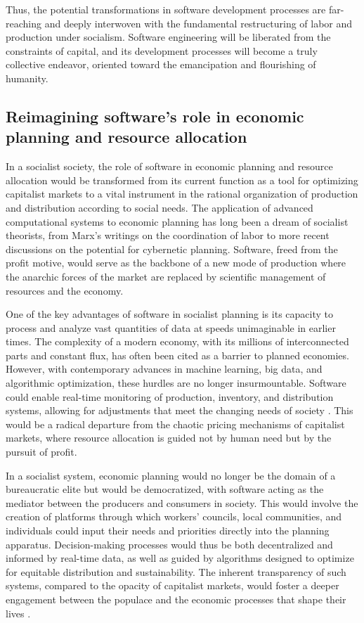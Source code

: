 \begin{refsection}
Thus, the potential transformations in software development processes are far-reaching and deeply interwoven with the fundamental restructuring of labor and production under socialism. Software engineering will be liberated from the constraints of capital, and its development processes will become a truly collective endeavor, oriented toward the emancipation and flourishing of humanity.

\subsection{Reimagining software's role in economic planning and resource allocation}

In a socialist society, the role of software in economic planning and resource allocation would be transformed from its current function as a tool for optimizing capitalist markets to a vital instrument in the rational organization of production and distribution according to social needs. The application of advanced computational systems to economic planning has long been a dream of socialist theorists, from Marx's writings on the coordination of labor to more recent discussions on the potential for cybernetic planning. Software, freed from the profit motive, would serve as the backbone of a new mode of production where the anarchic forces of the market are replaced by scientific management of resources and the economy.

One of the key advantages of software in socialist planning is its capacity to process and analyze vast quantities of data at speeds unimaginable in earlier times. The complexity of a modern economy, with its millions of interconnected parts and constant flux, has often been cited as a barrier to planned economies. However, with contemporary advances in machine learning, big data, and algorithmic optimization, these hurdles are no longer insurmountable. Software could enable real-time monitoring of production, inventory, and distribution systems, allowing for adjustments that meet the changing needs of society \cite[pp.~43-45]{cockshott1993}. This would be a radical departure from the chaotic pricing mechanisms of capitalist markets, where resource allocation is guided not by human need but by the pursuit of profit.

In a socialist system, economic planning would no longer be the domain of a bureaucratic elite but would be democratized, with software acting as the mediator between the producers and consumers in society. This would involve the creation of platforms through which workers’ councils, local communities, and individuals could input their needs and priorities directly into the planning apparatus. Decision-making processes would thus be both decentralized and informed by real-time data, as well as guided by algorithms designed to optimize for equitable distribution and sustainability. The inherent transparency of such systems, compared to the opacity of capitalist markets, would foster a deeper engagement between the populace and the economic processes that shape their lives \cite[pp.~67-70]{lenin1921}.


\end{refsection}
